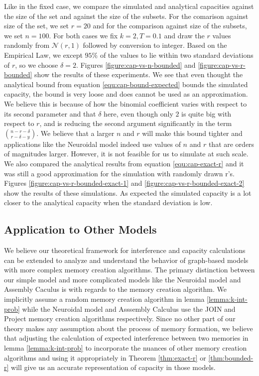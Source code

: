 Like in the fixed case, we compare the simulated and analytical capacities against the size of the set and against the size of the subsets. For the comarison against size of the set, we set $r = 20$ and for the comparison against size of the subsets, we set $n = 100$. For both cases we fix $k=2, T=0.1$ and draw the $r$ values randomly from $\mathcal{N}(r,1)$ followed by conversion to integer. Based on the Empirical Law, we except $95\%$ of the values to lie within two standard deviations of $r$, so we choose $\delta = 2$. Figures \ref{figure:cap-vs-n-bounded} and \ref{figure:cap-vs-r-bounded} show the results of these experiments. We see that even thought the analytical bound from equation \ref{equ:cap-bound-expected} bounds the simulated capacity, the bound is very loose and does cannot be used as an approximation. We believe this is because of how the binomial coefficient varies with respect to its second parameter and that $\delta$ here, even though only $2$ is quite big with respect to $r$, and is reducing the second argument significantly in the term $n - r - \delta \choose r - \delta - y$. We believe that a larger $n$ and $r$ will make this bound tighter and applications like the Neuroidal model indeed use values of $n$ and $r$ that are orders of magnitudes larger. However, it is not feasible for us to simulate at such scale. We also compared the analytical results from equation \ref{equ:cap-exact-r} and it was still a good approximation for the simulation with randomly drawn r's. Figures \ref{figure:cap-vs-r-bounded-exact-1} and \ref{figure:cap-vs-r-bounded-exact-2} show the results of these simulations. As expected the simulated capacity is a lot closer to the analytical capacity when the standard deviation is low. 

\subsection{Application to Other Models}

We believe our theoretical framework for interference and capacity calculations can be extended to analyze and understand the behavior of graph-based models with more complex memory creation algorithms. The primary distinction between our simple model and more complicated models like the Neuroidal model and Assembly Caculus is with regards to the memory creation algorithm. We implicitly assume a random memory creation algorithm in lemma \ref{lemma:k-int-prob} while the Neuroidal model and Asssembly Calculus use the JOIN and Project memory creation algorithms respectively. Since no other part of our theory makes any assumption about the process of memory formation, we believe that adjusting the calculation of expected interference between two memories in lemma \ref{lemma:k-int-prob} to incorporate the nuances of other memory creation algorithms and using it appropriately in Theorem \ref{thm:exact-r} or \ref{thm:bounded-r} will give us an accurate representation of capacity in those models.

